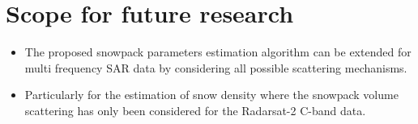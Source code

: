 \section{Scope for future research}
\begin{itemize}
	\item The proposed snowpack parameters estimation algorithm can be extended for multi frequency SAR data by considering all possible scattering mechanisms.
	\item Particularly for the estimation of snow density where the snowpack volume scattering has only been considered for the Radarsat-2 C-band data.  
\end{itemize}
  




 

